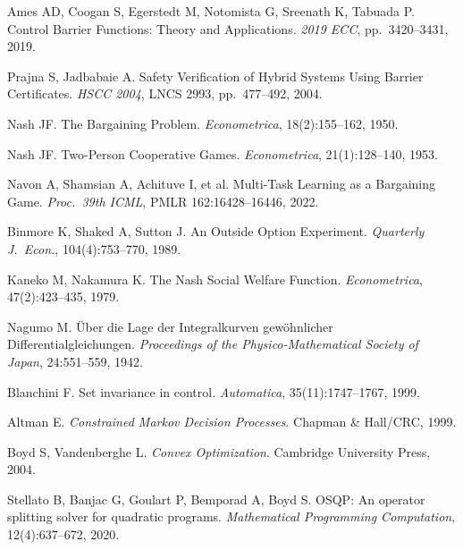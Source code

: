 \documentclass[11pt,a4paper]{article}
\begin{document}
\begin{enumerate}[label={[\arabic*]},leftmargin=*,noitemsep]
\item Ames AD, Coogan S, Egerstedt M, Notomista G, Sreenath K, Tabuada P. Control Barrier Functions: Theory and Applications. \emph{2019 ECC}, pp.~3420--3431, 2019.
\item Prajna S, Jadbabaie A. Safety Verification of Hybrid Systems Using Barrier Certificates. \emph{HSCC 2004}, LNCS 2993, pp.~477--492, 2004.
\item Nash JF. The Bargaining Problem. \emph{Econometrica}, 18(2):155--162, 1950.
\item Nash JF. Two-Person Cooperative Games. \emph{Econometrica}, 21(1):128--140, 1953.
\item Navon A, Shamsian A, Achituve I, et al. Multi-Task Learning as a Bargaining Game. \emph{Proc.\ 39th ICML}, PMLR 162:16428--16446, 2022.
\item Binmore K, Shaked A, Sutton J. An Outside Option Experiment. \emph{Quarterly J.\ Econ.}, 104(4):753--770, 1989.
\item Kaneko M, Nakamura K. The Nash Social Welfare Function. \emph{Econometrica}, 47(2):423--435, 1979.
\item Nagumo M. \"Uber die Lage der Integralkurven gew\"ohnlicher Differentialgleichungen. \emph{Proceedings of the Physico-Mathematical Society of Japan}, 24:551--559, 1942.
\item Blanchini F. Set invariance in control. \emph{Automatica}, 35(11):1747--1767, 1999.
\item Altman E. \emph{Constrained Markov Decision Processes}. Chapman \& Hall/CRC, 1999.
\item Boyd S, Vandenberghe L. \emph{Convex Optimization}. Cambridge University Press, 2004.
\item Stellato B, Banjac G, Goulart P, Bemporad A, Boyd S. OSQP: An operator splitting solver for quadratic programs. \emph{Mathematical Programming Computation}, 12(4):637--672, 2020.
\end{enumerate}
\end{document}
